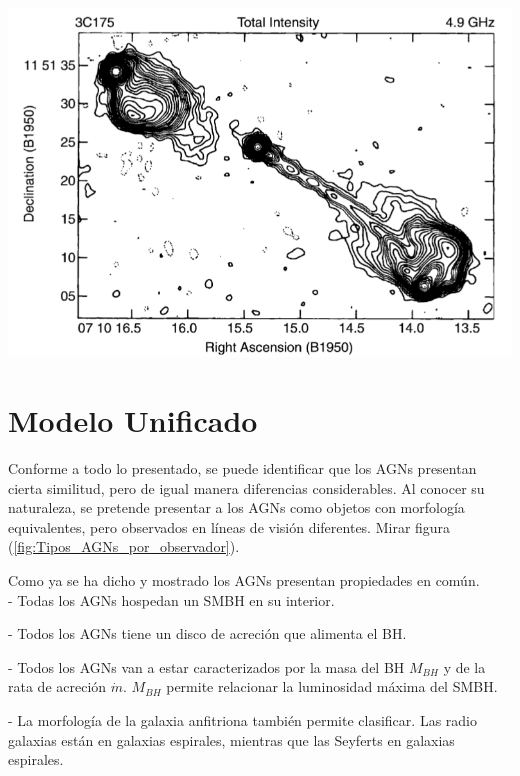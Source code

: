 \includegraphics[scale=.3]{./figures/3_AGNs/Lobulos_y_Jets.png}
\label{fig:Lobulos}


\section{Modelo Unificado}
\label{sec:Unified_models}

Conforme a todo lo presentado, se puede identificar que los AGNs presentan cierta similitud, pero de igual manera diferencias considerables. Al conocer su naturaleza, se pretende presentar a los AGNs como objetos con morfología equivalentes, pero observados en líneas de visión diferentes. Mirar figura (\ref{fig:Tipos_AGNs_por_observador}).

Como ya se ha dicho y mostrado los AGNs presentan propiedades en común. \\

- Todas los AGNs hospedan un SMBH en su interior. 

- Todos los AGNs tiene un disco de acreción que alimenta el BH.

- Todos los AGNs van a estar caracterizados por la masa del BH $M_{BH}$ y de la rata de acreción $\dot{m}$. $M_{BH}$ permite relacionar la luminosidad máxima del SMBH. 

- La morfología de la galaxia anfitriona también permite clasificar. Las radio galaxias están en galaxias espirales, mientras que las Seyferts en galaxias espirales.





